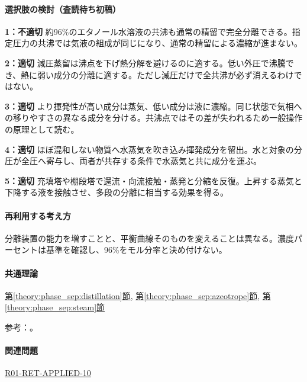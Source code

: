 \paragraph{選択肢の検討（査読待ち初稿）}\mbox{}\par

\noindent\textbf{1：不適切} 約96\%のエタノール水溶液の共沸も通常の精留で完全分離できる。指定圧力の共沸では気液の組成が同じになり、通常の精留による濃縮が進まない。\par

\noindent\textbf{2：適切} 減圧蒸留は沸点を下げ熱分解を避けるのに適する。低い外圧で沸騰でき、熱に弱い成分の分離に適する。ただし減圧だけで全共沸が必ず消えるわけではない。\par

\noindent\textbf{3：適切} より揮発性が高い成分は蒸気、低い成分は液に濃縮。同じ状態で気相への移りやすさの異なる成分を分ける。共沸点ではその差が失われるため一般操作の原理として読む。\par

\noindent\textbf{4：適切} ほぼ混和しない物質へ水蒸気を吹き込み揮発成分を留出。水と対象の分圧が全圧へ寄与し、両者が共存する条件で水蒸気と共に成分を運ぶ。\par

\noindent\textbf{5：適切} 充填塔や棚段塔で還流・向流接触・蒸発と分縮を反復。上昇する蒸気と下降する液を接触させ、多段の分離に相当する効果を得る。\par

\paragraph{再利用する考え方} 分離装置の能力を増すことと、平衡曲線そのものを変えることは異なる。濃度パーセントは基準を確認し、96\%をモル分率と決め付けない。

\paragraph{共通理論} \hyperref[theory:phase_sep:distillation]{第\ref*{theory:phase_sep:distillation}節}, \hyperref[theory:phase_sep:azeotrope]{第\ref*{theory:phase_sep:azeotrope}節}, \hyperref[theory:phase_sep:steam]{第\ref*{theory:phase_sep:steam}節}

\par 参考：\cite{nptel_distillation1,nptel_azeotrope}。

\paragraph{関連問題} \hyperref[q:r01-ret-applied-10]{R01-RET-APPLIED-10}

